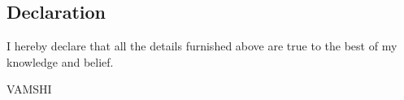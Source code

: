 \documentclass[margin,line]{res}
\begin{document}
\begin{resume}
\section{\sc Declaration}
I hereby declare that all the details furnished above are true to the best of my knowledge and belief. 
\begin{flushright}
VAMSHI
\end{flushright}

\end{resume}
\end{document}
